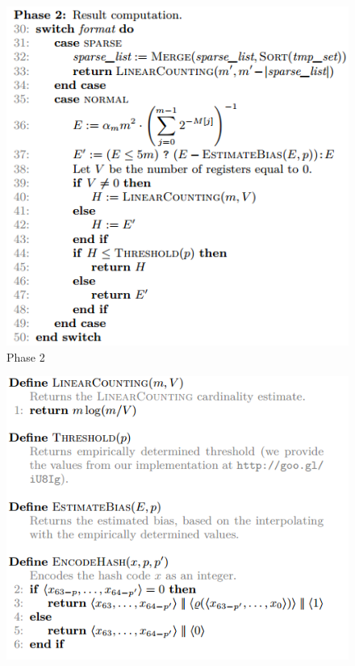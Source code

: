 \documentclass{beamer}
\begin{document}
\begin{frame}
\begin{figure}[h]
\includegraphics[scale=0.6]{img7.png}
\caption{Phase 2}
\end{figure}
\end{frame}
\begin{frame}
\begin{figure}[h]
\includegraphics[scale=0.7]{img8.png}
\end{figure}
\end{frame}
\end{document}
